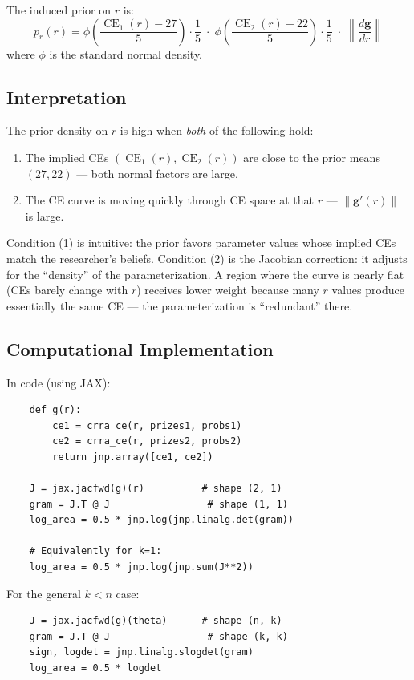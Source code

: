 \documentclass[11pt,a4paper]{article}
\theoremstyle{definition}
\DeclareMathOperator{\CE}{CE}
\begin{document}
The induced prior on $r$ is:
\begin{equation}
    \label{eq:crra_prior}
    p_r(r) = \phi\!\left(\frac{\CE_1(r) - 27}{5}\right) \cdot \frac{1}{5}
    \;\cdot\; \phi\!\left(\frac{\CE_2(r) - 22}{5}\right) \cdot \frac{1}{5}
    \;\cdot\; \left\|\frac{d\mathbf{g}}{dr}\right\|
\end{equation}
where $\phi$ is the standard normal density.

\subsection{Interpretation}

The prior density on $r$ is high when \emph{both} of the following hold:
\begin{enumerate}
    \item The implied CEs $(\CE_1(r), \CE_2(r))$ are close to the prior means
    $(27, 22)$ --- both normal factors are large.
    \item The CE curve is moving quickly through CE space at that $r$ ---
    $\|\mathbf{g}'(r)\|$ is large.
\end{enumerate}

Condition (1) is intuitive: the prior favors parameter values whose
implied CEs match the researcher's beliefs. Condition (2) is the Jacobian
correction: it adjusts for the ``density'' of the parameterization. A region
where the curve is nearly flat (CEs barely change with $r$) receives lower
weight because many $r$ values produce essentially the same CE --- the
parameterization is ``redundant'' there.

\subsection{Computational Implementation}

In code (using JAX):
\begin{verbatim}
    def g(r):
        ce1 = crra_ce(r, prizes1, probs1)
        ce2 = crra_ce(r, prizes2, probs2)
        return jnp.array([ce1, ce2])

    J = jax.jacfwd(g)(r)          # shape (2, 1)
    gram = J.T @ J                 # shape (1, 1)
    log_area = 0.5 * jnp.log(jnp.linalg.det(gram))

    # Equivalently for k=1:
    log_area = 0.5 * jnp.log(jnp.sum(J**2))
\end{verbatim}

For the general $k < n$ case:
\begin{verbatim}
    J = jax.jacfwd(g)(theta)      # shape (n, k)
    gram = J.T @ J                 # shape (k, k)
    sign, logdet = jnp.linalg.slogdet(gram)
    log_area = 0.5 * logdet
\end{verbatim}
\end{document}
